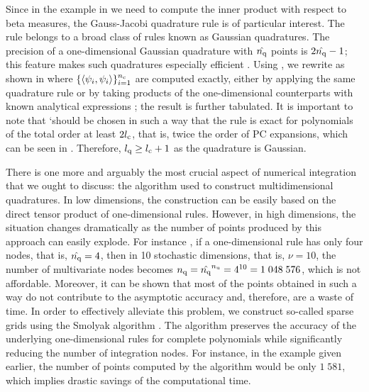 Since in the example in  we need to compute the inner
product with respect to beta measures, the Gauss-Jacobi quadrature rule is of
particular interest. The rule belongs to a broad class of rules known as
Gaussian quadratures. The precision of a one-dimensional Gaussian quadrature
with $\hat{{n_\mathrm{q}}}$ points is $2 \hat{{n_\mathrm{q}}} - 1$; this feature makes such
quadratures especially efficient \cite{heiss2008}. Using , we
rewrite  as shown in 
where $\{ \left\langle \psi_i, \psi_i \right\rangle \}_{i = 1}^{n_\mathrm{c}}$ are computed exactly,
either by applying the same quadrature rule or by taking products of the
one-dimensional counterparts with known analytical expressions \cite{xiu2010};
the result is further tabulated. It is important to note that \lq should be
chosen in such a way that the rule is exact for polynomials of the total order
at least $2 {l_\mathrm{c}}$, that is, twice the order of PC expansions, which can be seen
in  \cite{eldred2008}. Therefore, ${l_\mathrm{q}} \geq {l_\mathrm{c}} + 1$ as
the quadrature is Gaussian.

There is one more and arguably the most crucial aspect of numerical integration
that we ought to discuss: the algorithm used to construct multidimensional
quadratures. In low dimensions, the construction can be easily based on the
direct tensor product of one-dimensional rules. However, in high dimensions, the
situation changes dramatically as the number of points produced by this approach
can easily explode. For instance \cite{heiss2008}, if a one-dimensional rule has
only four nodes, that is, $\hat{{n_\mathrm{q}}} = 4$, then in 10 stochastic dimensions,
that is, $\nu = 10$, the number of multivariate nodes becomes ${n_\mathrm{q}} =
\hat{{n_\mathrm{q}}}^{n_\mathrm{u}} = 4^{10} = 1\;048\;576$, which is not affordable. Moreover, it can
be shown that most of the points obtained in such a way do not contribute to the
asymptotic accuracy and, therefore, are a waste of time. In order to effectively
alleviate this problem, we construct so-called sparse grids using the Smolyak
algorithm \cite{eldred2008, heiss2008, burkardt2013}. The algorithm preserves
the accuracy of the underlying one-dimensional rules for complete polynomials
while significantly reducing the number of integration nodes. For instance, in
the example given earlier, the number of points computed by the algorithm would
be only $1\;581$, which implies drastic savings of the computational time.
